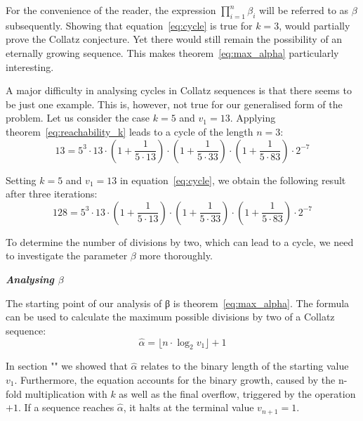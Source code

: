 \documentclass{SciPress_2015}
\renewcommand{\subsection}[1]{\textit{\textbf{#1}}}
\begin{document}
\par\medskip
For the convenience of the reader, the expression $\prod_{i=1}^{n}\beta_i$ will be referred to as $\beta$ subsequently. Showing that equation~\ref{eq:cycle} is true for $k=3$, would partially prove the Collatz conjecture. Yet there would still remain the possibility of an eternally growing sequence. This makes theorem~\ref{eq:max_alpha} particularly interesting.

\par\medskip
A major difficulty in analysing cycles in Collatz sequences is that there seems to be just one example. This is, however, not true for our generalised form of the problem. Let us consider the case $k=5$ and $v_1=13$. Applying theorem~\ref{eq:reachability_k} leads to a cycle of the length $n=3$:
\[
13=5^3\cdot13\cdot\left(1+\frac{1}{5\cdot13}\right)\cdot\left(1+\frac{1}{5\cdot33}\right)\cdot\left(1+\frac{1}{5\cdot83}\right)\cdot2^{-7}
\]

Setting $k=5$ and $v_1=13$ in equation~\ref{eq:cycle}, we obtain the following result after three iterations:
\[
128=5^3\cdot13\cdot\left(1+\frac{1}{5\cdot13}\right)\cdot\left(1+\frac{1}{5\cdot33}\right)\cdot\left(1+\frac{1}{5\cdot83}\right)\cdot2^{-7}
\]

To determine the number of divisions by two, which can lead to a cycle, we need to investigate the parameter $\beta$ more thoroughly.

\vspace{1em}\noindent
\subsection{Analysing \boldmath$\beta$}
\par\noindent
The starting point of our analysis of β is theorem~\ref{eq:max_alpha}. The formula can be used to calculate the maximum possible divisions by two of a Collatz sequence:
\[
\hat\alpha=\lfloor n\cdot\log_2v_1\rfloor+1
\]

In section "" we showed that $\hat\alpha$ relates to the binary length of the starting value $v_1$. Furthermore, the equation accounts for the binary growth, caused by the n-fold multiplication with $k$ as well as the final overflow, triggered by the operation $+1$. If a sequence reaches $\hat\alpha$, it halts at the terminal value $v_{n+1}=1$.
\end{document}
